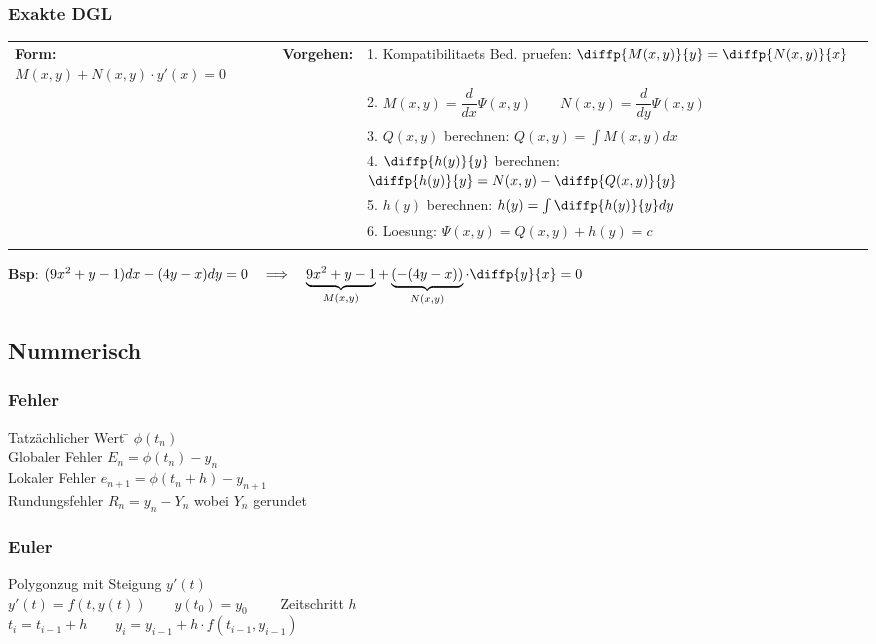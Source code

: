 \subsubsection{Exakte DGL}
\begin{tabular}{p{6cm}p{2cm}p{10.5cm}}
\textbf{Form:} $M(x,y) + N(x,y)\cdot y'(x) = 0$ &
\textbf{Vorgehen:}              &

1. Kompatibilitaets Bed. pruefen: $\diffp{M(x,y)}{y} = \diffp{N(x,y)}{x}$ \\ &&
2. $ M(x,y) = \dfrac{d}{dx}\Psi(x,y) \qquad N(x,y) = \dfrac{d}{dy}\Psi(x,y) $ \\ &&
3. $Q(x,y)$ berechnen: $Q(x,y) = \int M(x,y) dx$ \\ &&
4. $\diffp{h(y)}{y}$ berechnen: $\diffp{h(y)}{y} = N(x,y) - \diffp{Q(x,y)}{y}$ \\ &&
5. $h(y)$ berechnen: $h(y) = \int \diffp{h(y)}{y} dy $ \\ &&
6. Loesung: $\Psi(x,y) = Q(x,y) + h(y) = c $ \\ &&
\end{tabular}
\textbf{Bsp}: $(9x^2 + y -1)dx - (4y -x)dy = 0 \quad \Longrightarrow \quad  \underbrace{9x^2 +y -1}_{M(x,y)} + \underbrace{(-(4y -x))}_{N(x,y)} \cdot \diffp{y}{x} = 0$

\subsection{Nummerisch}
\subsubsection{Fehler}

\begin{tabbing}
Tatzächlicher Wert  \= $\phi(t_n)$ \\
Globaler Fehler \> $E_n = \phi(t_n) - y_n$ \\
Lokaler Fehler \> $e_{n+1} = \phi(t_n + h) - y_{n+1}$ \\
Rundungsfehler \> $R_n = y_n - Y_n$ wobei $Y_n$ gerundet
\end{tabbing}

\subsubsection{Euler}
Polygonzug mit Steigung $y'(t)$\\
$y'(t)=f(t,y(t)) \qquad y(t_0)=y_0 \qquad$ Zeitschritt $h$\\
$t_i = t_{i-1} + h \qquad y_i=y_{i-1} + h \cdot f(t_{i-1},y_{i-1})$\\

